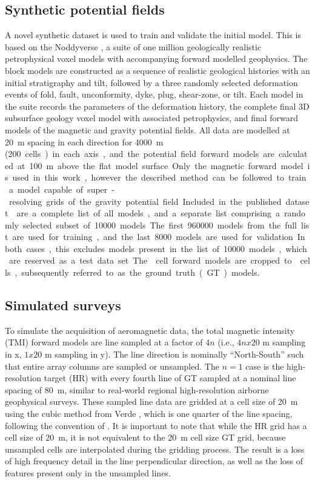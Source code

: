 \documentclass[manuscript.tex]{subfiles}
\begin{document}
\subsection{Synthetic potential fields}
A novel synthetic dataset is used to train and validate the initial model.
This is based on the Noddyverse \parencite{jessellNoddyverseMassiveData2022}, a suite of one million geologically realistic petrophysical voxel models with accompanying forward modelled geophysics.
The block models are constructed as a sequence of realistic geological histories with an initial stratigraphy and tilt, followed by a three randomly selected deformation events of fold, fault, unconformity, dyke, plug, shear-zone, or tilt.
Each model in the suite records the parameters of the deformation history, the complete final 3D subsurface geology voxel model with associated petrophysics, and final forward models of the magnetic and gravity potential fields.
All data are modelled at \qty{20}{\m} spacing in each direction for \qty{4000}{\m} (\qty{200} cells) in each axis, and the potential field forward models are calculated at \qty{100}{\m} above the flat model surface.
Only the magnetic forward model is used in this work, however the described method can be followed to train a model capable of super-resolving grids of the gravity potential field.

Included in the published dataset \parencite{jessellNoddyverseMassiveData2022} are a complete list of all models, and a separate list comprising a randomly selected subset of \qty{10000} models.
The first \qty{960000} models from the full list are used for training, and the last \qty{8000} models are used for validation.
In both cases, this excludes models present in the list of \qty{10000} models, which are reserved as a test data set.
The  cell forward models are cropped to  cells, subsequently referred to as the ground truth (GT) models.

\subsection{Simulated surveys}
To simulate the acquisition of aeromagnetic data, the  total magnetic intensity (TMI) forward models are line sampled at a factor of \(4n\)  (i.e., \(4n x 20\) m sampling in x, \(1 x 20\) m sampling in y).
The line direction is nominally ``North-South'' such that entire array columns are sampled or unsampled.
The \(n = 1\) case is the high-resolution target (HR) with every fourth line of GT sampled at a nominal line spacing of \qty{80}{\m}, similar to real-world regional high-resolution airborne geophysical surveys.
These sampled line data are gridded at a cell size of \qty{20}{\m} using the cubic method from Verde \parencite{uieda2018}, which is one quarter of the line spacing, following the convention of \textcite{reidAeromagneticSurveyDesign1980}.
It is important to note that while the HR grid has a cell size of \qty{20}{\m}, it is not equivalent to the \qty{20}{\m} cell size GT grid, because unsampled cells are interpolated during the gridding process.
The result is a loss of high frequency detail in the line perpendicular direction, as well as the loss of features present only in the unsampled lines.
\end{document}
